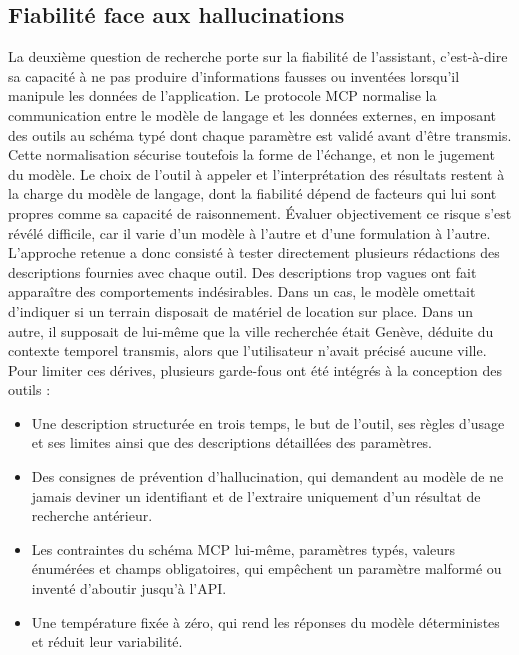 \documentclass[12pt]{article}
\begin{document}
\subsection{Fiabilité face aux hallucinations}
La deuxième question de recherche porte sur la fiabilité de l'assistant, c'est-à-dire sa capacité à ne pas produire d'informations fausses ou inventées lorsqu'il manipule les données de l'application. Le protocole MCP normalise la communication entre le modèle de langage et les données externes, en imposant des outils au schéma typé dont chaque paramètre est validé avant d'être transmis. Cette normalisation sécurise toutefois la forme de l'échange, et non le jugement du modèle. Le choix de l'outil à appeler et l'interprétation des résultats restent à la charge du modèle de langage, dont la fiabilité dépend de facteurs qui lui sont propres comme sa capacité de raisonnement.
\newline\newline
Évaluer objectivement ce risque s'est révélé difficile, car il varie d'un modèle à l'autre et d'une formulation à l'autre. L'approche retenue a donc consisté à tester directement plusieurs rédactions des descriptions fournies avec chaque outil. Des descriptions trop vagues ont fait apparaître des comportements indésirables. Dans un cas, le modèle omettait d'indiquer si un terrain disposait de matériel de location sur place. Dans un autre, il supposait de lui-même que la ville recherchée était Genève, déduite du contexte temporel transmis, alors que l'utilisateur n'avait précisé aucune ville.
\newline\newline
Pour limiter ces dérives, plusieurs garde-fous ont été intégrés à la conception des outils :
\newline
\begin{itemize}
    \item Une description structurée en trois temps, le but de l'outil, ses règles d'usage et ses limites ainsi que des descriptions détaillées des paramètres.
    \item Des consignes de prévention d'hallucination, qui demandent au modèle de ne jamais deviner un identifiant et de l'extraire uniquement d'un résultat de recherche antérieur.
    \item Les contraintes du schéma MCP lui-même, paramètres typés, valeurs énumérées et champs obligatoires, qui empêchent un paramètre malformé ou inventé d'aboutir jusqu'à l'API.
    \item Une température fixée à zéro, qui rend les réponses du modèle déterministes et réduit leur variabilité.
\end{itemize}
\end{document}
